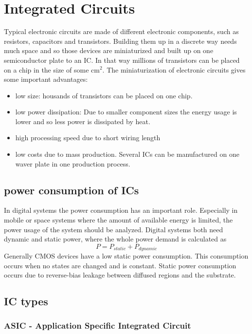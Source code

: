 \chapter{Integrated Circuits}
Typical electronic circuits are made of different electronic components, such as resistors, capacitors and transistors. Building them up in a discrete way needs much space and so those devices are miniaturized and built up on one semiconductor plate to an IC. In that way millions of transistors can be placed on a chip in the size of some cm$^2$. The miniaturization of electronic circuits gives some important advantages:
\begin{itemize}
\item low size: housands of transistors can be placed on one chip.
\item low power dissipation: Due to smaller component sizes the energy usage is lower and so less power is dissipated by heat.
\item high processing speed due to short wiring length
\item low costs due to mass production. Several ICs can be manufactured on one waver plate in one production process.
\end{itemize}
\section{power consumption of ICs}
In digital systems the power consumption has an important role. Especially in mobile or space systems where the amount of available energy is limited, the power usage of the system should be analyzed. Digital systems both need dynamic and static power, where the whole power demand is calculated as
\begin{equation}
P=P_{static}+P_{dynamic}
\end{equation}
Generally CMOS devices have a low static power consumption. This consumption occurs when no states are changed and is constant. Static power consumption occurs due to reverse-bias leakage between diffused regions and the substrate.\cite{Sar97} 
\section{IC types}
\subsection{ASIC - Application Specific Integrated Circuit}

